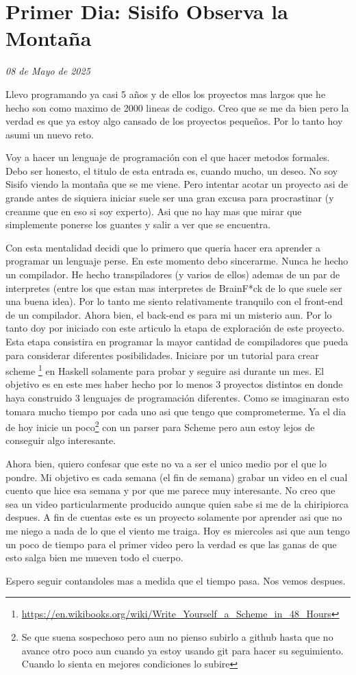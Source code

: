 \section{Primer Dia: Sisifo Observa la Montaña}
\emph{08 de Mayo de 2025}

Llevo programando ya casi 5 años y de ellos los proyectos mas largos que he hecho
son como maximo de 2000 lineas de codigo. Creo que se me da bien pero la verdad es que
ya estoy algo cansado de los proyectos pequeños. Por lo tanto hoy asumi un nuevo reto.

Voy a hacer un lenguaje de programación con el que hacer metodos formales. Debo ser
honesto, el titulo de esta entrada es, cuando mucho, un deseo. No soy Sisifo viendo
la montaña que se me viene. Pero intentar acotar un proyecto asi de grande antes de
siquiera iniciar suele ser una gran
excusa para procrastinar (y creanme que en eso si soy experto). Asi que no hay mas que mirar
que simplemente ponerse los guantes y salir a ver que se encuentra.

Con esta mentalidad decidi que lo primero que queria hacer era aprender a programar un
lenguaje perse. En este momento debo sincerarme. Nunca he hecho un compilador. He hecho
transpiladores (y varios de ellos) ademas de un par de interpretes (entre los que estan
mas interpretes de BrainF*ck de lo que suele ser una buena idea). Por lo tanto me siento
relativamente tranquilo con el front-end de un compilador. Ahora bien, el back-end es para
mi un misterio aun. Por lo tanto doy por iniciado con este articulo la etapa de exploración
de este proyecto. Esta etapa consistira en programar la mayor cantidad de compiladores que
pueda para considerar diferentes posibilidades. Iniciare por un tutorial para crear scheme
\footnote{\url{https://en.wikibooks.org/wiki/Write_Yourself_a_Scheme_in_48_Hours}} en
Haskell solamente para probar y seguire asi durante un mes. El objetivo es en este mes
haber hecho por lo menos 3 proyectos distintos en donde haya construido 3 lenguajes de
programación diferentes. Como se imaginaran esto tomara mucho tiempo por cada uno asi que
tengo que comprometerme. Ya el dia de hoy inicie un
poco\footnote{Se que suena sospechoso pero aun no pienso subirlo a github hasta que no avance otro poco aun cuando ya estoy usando git para hacer su seguimiento. Cuando lo sienta en mejores condiciones lo subire}
con un parser para Scheme pero aun estoy lejos de conseguir algo interesante.

Ahora bien, quiero confesar que este no va a ser el unico medio por el que lo pondre. Mi objetivo es
cada semana (el fin de semana) grabar un video en el cual cuento que hice esa semana y por que me parece
muy interesante. No creo que sea un video particularmente producido aunque quien sabe si me de la
chiripiorca despues. A fin de cuentas este es un proyecto solamente por aprender asi que no me niego
a nada de lo que el viento me traiga. Hoy es miercoles asi que aun tengo un poco de tiempo para
el primer video pero la verdad es que las ganas de que esto salga bien me mueven todo el cuerpo.

Espero seguir contandoles mas a medida que el tiempo pasa. Nos vemos despues.
